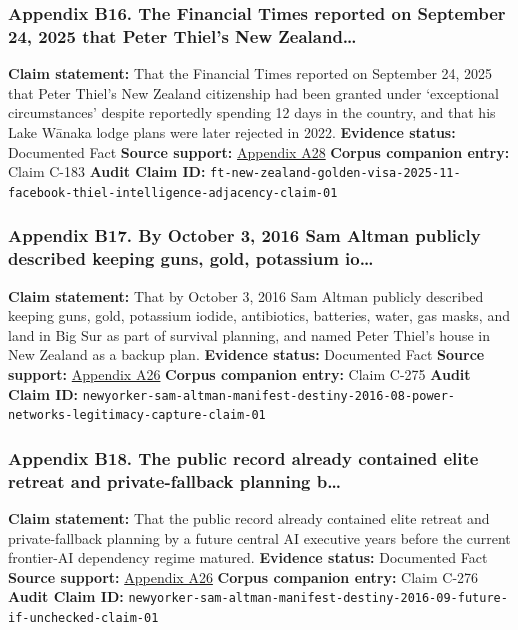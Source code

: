 \documentclass[
  american,
  11pt,
  letterpaper,
]{article}
\begin{document}
\subsubsection{Appendix B16. The Financial Times reported on September
24, 2025 that Peter Thiel's New
Zealand\ldots{}}\label{ch-10-appendix-b16-the-financial-times-reported-on-september-24-2025-that-peter-thiel-s-new-zealand}

\textbf{Claim statement:} That the Financial Times reported on September
24, 2025 that Peter Thiel's New Zealand citizenship had been granted
under `exceptional circumstances' despite reportedly spending 12 days in
the country, and that his Lake Wānaka lodge plans were later rejected in
2022. \textbf{Evidence status:} Documented Fact \textbf{Source support:}
\hyperref[ch-10-appendix-a28-new-zealand-woos-the-wealthy-with-golden-visa-changes]{Appendix
A28} \textbf{Corpus companion entry:} Claim C-183 \textbf{Audit Claim
ID:}
\texttt{ft-new-zealand-golden-visa-2025-11-facebook-thiel-intelligence-adjacency-claim-01}

\subsubsection{Appendix B17. By October 3, 2016 Sam Altman publicly
described keeping guns, gold, potassium
io\ldots{}}\label{ch-10-appendix-b17-by-october-3-2016-sam-altman-publicly-described-keeping-guns-gold-potassium-io}

\textbf{Claim statement:} That by October 3, 2016 Sam Altman publicly
described keeping guns, gold, potassium iodide, antibiotics, batteries,
water, gas masks, and land in Big Sur as part of survival planning, and
named Peter Thiel's house in New Zealand as a backup plan.
\textbf{Evidence status:} Documented Fact \textbf{Source support:}
\hyperref[ch-10-appendix-a26-sam-altman-s-manifest-destiny]{Appendix
A26} \textbf{Corpus companion entry:} Claim C-275 \textbf{Audit Claim
ID:}
\texttt{newyorker-sam-altman-manifest-destiny-2016-08-power-networks-legitimacy-capture-claim-01}

\subsubsection{Appendix B18. The public record already contained elite
retreat and private-fallback planning
b\ldots{}}\label{ch-10-appendix-b18-the-public-record-already-contained-elite-retreat-and-private-fallback-planning-b}

\textbf{Claim statement:} That the public record already contained elite
retreat and private-fallback planning by a future central AI executive
years before the current frontier-AI dependency regime matured.
\textbf{Evidence status:} Documented Fact \textbf{Source support:}
\hyperref[ch-10-appendix-a26-sam-altman-s-manifest-destiny]{Appendix
A26} \textbf{Corpus companion entry:} Claim C-276 \textbf{Audit Claim
ID:}
\texttt{newyorker-sam-altman-manifest-destiny-2016-09-future-if-unchecked-claim-01}
\end{document}
